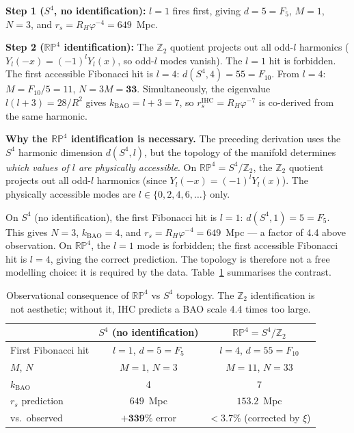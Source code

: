 \documentclass[12pt,a4paper]{article}
\begin{document}
\textbf{Step 1 ($S^4$, no identification):} $l=1$ fires first, giving
$d = 5 = F_5$, $M = 1$, $N = 3$, and $r_s = R_H\varphi^{-4} = 649$~Mpc.

\textbf{Step 2 ($\mathbb{RP}^4$ identification):} The $\mathbb{Z}_2$ quotient
projects out all odd-$l$ harmonics ($Y_l(-x) = (-1)^l Y_l(x)$, so odd-$l$
modes vanish). The $l=1$ hit is forbidden. The first accessible Fibonacci
hit is $l = 4$: $d(S^4, 4) = 55 = F_{10}$.
From $l=4$: $M = F_{10}/5 = 11$, $N = 3M = \mathbf{33}$.
Simultaneously, the eigenvalue $l(l+3) = 28/R^2$ gives
$k_\mathrm{BAO} = l+3 = 7$, so $r_s^\mathrm{IHC} = R_H\varphi^{-7}$ is
co-derived from the same harmonic.

\textbf{Why the $\mathbb{RP}^4$ identification is necessary.}
The preceding derivation uses the $S^4$ harmonic dimension $d(S^4, l)$, but the
topology of the manifold determines \emph{which values of $l$ are physically
accessible}. On $\mathbb{RP}^4 = S^4/\mathbb{Z}_2$, the $\mathbb{Z}_2$ quotient
projects out all odd-$l$ harmonics (since $Y_l(-x) = (-1)^l Y_l(x)$). The
physically accessible modes are $l \in \{0, 2, 4, 6, \ldots\}$ only.

On $S^4$ (no identification), the first Fibonacci hit is $l = 1$:
$d(S^4, 1) = 5 = F_5$. This gives $N = 3$, $k_\mathrm{BAO} = 4$,
and $r_s = R_H\varphi^{-4} = 649$~Mpc --- a factor of 4.4 above observation.
On $\mathbb{RP}^4$, the $l = 1$ mode is forbidden; the first accessible
Fibonacci hit is $l = 4$, giving the correct prediction.
The topology is therefore not a free modelling choice: it is required by the
data. Table~\ref{tab:topology_comparison} summarises the contrast.

\begin{table}[h]
\centering
\caption{Observational consequence of $\mathbb{RP}^4$ vs $S^4$ topology.
The $\mathbb{Z}_2$ identification is not aesthetic; without it, IHC predicts
a BAO scale 4.4 times too large.}
\label{tab:topology_comparison}
\begin{tabular}{lcc}
\hline
 & $S^4$ (no identification) & $\mathbb{RP}^4 = S^4/\mathbb{Z}_2$ \\
\hline
First Fibonacci hit   & $l = 1$, $d = 5 = F_5$ & $l = 4$, $d = 55 = F_{10}$ \\
$M$, $N$              & $M = 1$, $N = 3$        & $M = 11$, $N = 33$          \\
$k_\mathrm{BAO}$      & 4                        & 7                            \\
$r_s$ prediction      & $649$~Mpc               & $153.2$~Mpc                 \\
vs.\ observed         & $\mathbf{+339\%}$ error  & $< 3.7\%$ (corrected by $\xi$) \\
\hline
\end{tabular}
\end{table}
\end{document}
